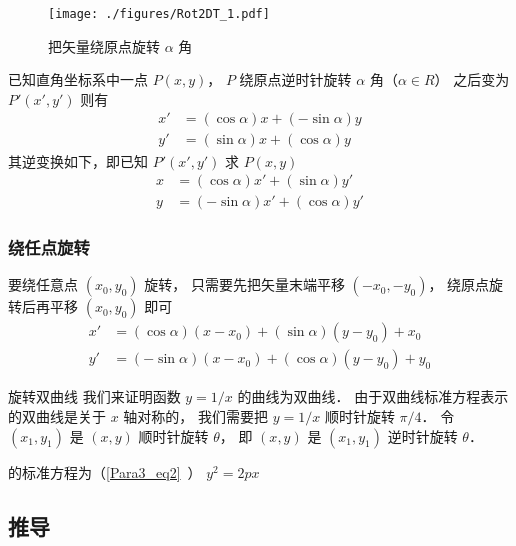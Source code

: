 

\begin{figure}[ht]
\centering
\texttt{[image: ./figures/Rot2DT\_1.pdf]}
\caption{把矢量绕原点旋转 $\alpha$ 角} \label{Rot2DT_fig1}
\end{figure}

已知直角坐标系中一点 $P(x,y)$， $P$ 绕原点逆时针旋转 $\alpha $ 角（$\alpha  \in R$） 之后变为 $P'(x',y')$ 则有
\begin{align}\label{Rot2DT_eq1}
x' &= (\cos \alpha)x + (- \sin \alpha)y \\
\label{Rot2DT_eq2}
y' &= (\sin \alpha)x + (\cos \alpha)y
\end{align}
其逆变换如下，即已知 $P'(x',y')$ 求 $P(x,y)$ 
\begin{align}\label{Rot2DT_eq3}
x &= ( \cos \alpha  )x' + ( \sin \alpha  )y' \\
\label{Rot2DT_eq4}
y &= ( - \sin \alpha)x' + ( \cos \alpha )y'
\end{align}

\subsubsection{绕任点旋转}
要绕任意点 $(x_0, y_0)$ 旋转， 只需要先把矢量末端平移 $(-x_0, -y_0)$， 绕原点旋转后再平移 $(x_0, y_0)$ 即可
\begin{equation}\label{Rot2DT_eq5}
\begin{aligned}
x' &= ( \cos \alpha  )(x-x_0) + ( \sin \alpha  )(y-y_0) + x_0 \\
y' &= ( - \sin \alpha)(x-x_0) + ( \cos \alpha )(y-y_0) + y_0
\end{aligned}
\end{equation}

\begin{example}{旋转双曲线}
我们来证明函数 $y = 1/x$ 的曲线为双曲线． 由于双曲线标准方程表示的双曲线是关于 $x$ 轴对称的， 我们需要把 $y = 1/x$ 顺时针旋转 $\pi/4$． 令 $(x_1, y_1)$ 是 $(x, y)$ 顺时针旋转 $\theta$， 即 $(x, y)$ 是 $(x_1, y_1)$ 逆时针旋转 $\theta$．


的标准方程为（\autoref{Para3_eq2}~） $y^2 = 2px$
\end{example}

\subsection{推导}

